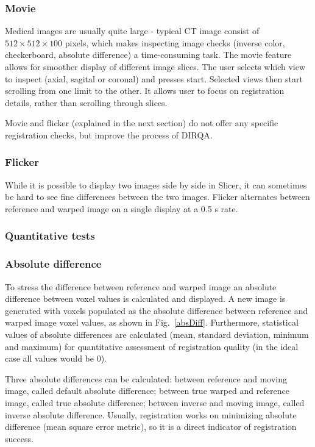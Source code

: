 \documentclass[type=dr, dr=rernat, accentcolor=tud7b,colorbacktitle, bigchapter, openright, twoside, 12pt ]{tudthesis}
\begin{document}
\subsubsection{Movie}

Medical images are usually quite large - typical CT image consist of $512 \times 512 \times 100$ pixels, which makes inspecting image checks (inverse color, checkerboard, absolute difference) a time-consuming task. The movie feature allows for smoother display of different image slices. 
The user selects which view to inspect (axial, sagital or coronal) and presses start. Selected views then start scrolling from one limit to the other. It allows user to focus on registration details, rather than scrolling through slices.

Movie and flicker (explained in the next section) do not offer any specific registration checks, but improve the process of DIRQA.

\subsubsection{Flicker}

While it is possible to display two images side by side in Slicer, it can sometimes be hard to see fine differences between the two images. Flicker alternates between reference and warped image on a single display at a 0.5 s rate.

\subsubsection{Quantitative tests}

\subsubsection{Absolute difference}

To stress the difference between reference and warped image an absolute difference between voxel values is calculated and displayed. 
A new image is generated with voxels populated as the absolute difference between reference and warped image voxel values, as shown in Fig.~\ref{absDiff}.
Furthermore, statistical values of absolute differences are calculated (mean, standard deviation, minimum and maximum) 
for quantitative assessment of registration quality (in the ideal case all values would be 0).

Three absolute differences can be calculated: between reference and moving image, called default absolute difference; between true warped and reference image, called true absolute difference; between inverse and moving image, called
inverse absolute difference. Usually, registration works on minimizing absolute difference (mean square error metric), so it is a direct indicator
of registration success.
\end{document}
